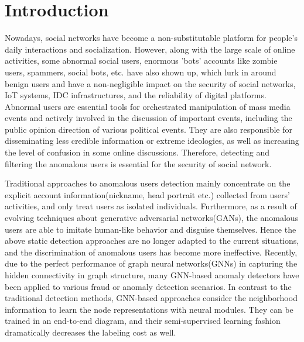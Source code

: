 \documentclass[conference]{IEEEtran}
\theoremstyle{definition}
\begin{document}
\section{Introduction}
Nowadays, social networks have become a non-substitutable platform for people's daily interactions and socialization. However, along with the large scale of online activities, some abnormal social users, enormous 'bots' accounts like zombie users, spammers, social bots, etc. have also shown up, which lurk in around benign users and have a non-negligible impact on the security of social networks\cite{nobata2016abusive}, IoT systems\cite{qian2020orchestrating}, IDC infrastructures\cite{hu2020toposch, wen2019ga,hase2016}, and the reliability of digital platforms\cite{tsc2017, yang2020performance}. Abnormal users are essential tools for orchestrated manipulation of mass media events and actively involved in the discussion of important events, including the public opinion direction of various political events\cite{yang2020rumor}. They are also responsible for disseminating less credible information or extreme ideologies, as well as increasing the level of confusion in some online discussions\cite{wang2019fdgars}. Therefore, detecting and filtering the anomalous users is essential for the security of social network\cite{gao2020hincti}.

Traditional approaches to anomalous users detection mainly concentrate on the explicit account information\cite{Beskow2019}(nickname, head portrait   etc.) collected from users' activities, and only treat users as isolated individuals. Furthermore, as a result of evolving techniques about generative adversarial networks(GANs)\cite{huang2020reinforced,wang2020seqst}, the anomalous users are able to imitate human-like behavior and disguise themselves. Hence the above static detection approaches are no longer adapted to the current situations, and the discrimination of anomalous users has become more ineffective\cite{zhu2020adversarial}. Recently, due to the perfect performance of graph neural networks(GNNs) in capturing the hidden connectivity in graph structure, many GNN-based anomaly detectors have been applied to various fraud or anomaly detection scenarios\cite{li2019spam, sun2020kollector}. In contrast to the traditional detection methods, GNN-based approaches consider the neighborhood information to learn the node representations with neural modules. They can be trained in an end-to-end diagram\cite{liu2020alleviating}, and their semi-supervised learning fashion dramatically decreases the labeling cost as well.
\end{document}
